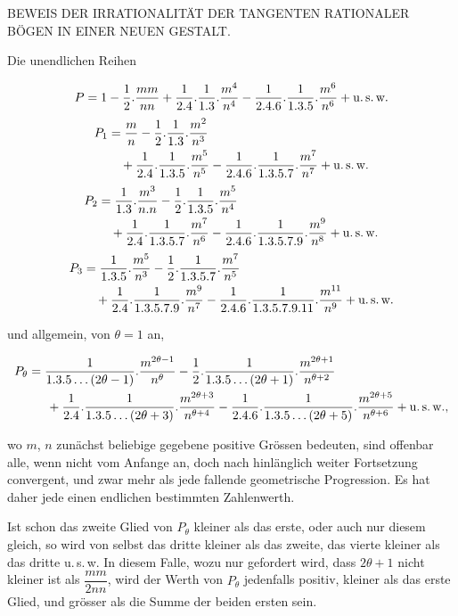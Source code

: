 \clearpage
{}

\begin{center}\large BEWEIS DER IRRATIONALITÄT DER TANGENTEN RATIONALER BÖGEN IN EINER NEUEN GESTALT.\end{center}

\noindent\hspace*{\parindent}Die unendlichen Reihen

\[
P = 1-\frac{1}{2} . \frac{mm}{nn}+\frac{1}{2.4} . \frac{1}{1.3} . \frac{m^4}{n^4}-\frac{1}{2.4.6} . \frac{1}{1.3.5} . \frac{m^6}{n^6}+\text{u.\,s.\,w.}
\]
\[
\begin{aligned}
P_1 &= \frac{m}{n}-\frac{1}{2} . \frac{1}{1.3} . \frac{m^2}{n^3}\\ &\quad+\frac{1}{2.4} . \frac{1}{1.3.5} . \frac{m^5}{n^5}-\frac{1}{2.4.6} . \frac{1}{1.3.5.7} . \frac{m^7}{n^7}+\text{u.\,s.\,w.}
\end{aligned}
\]
\[
\begin{aligned}
P_2 &= \frac{1}{1.3} . \frac{m^3}{n.n}-\frac{1}{2} . \frac{1}{1.3.5} . \frac{m^5}{n^4}\\ &\quad+\frac{1}{2.4} . \frac{1}{1.3.5.7} . \frac{m^7}{n^6}-\frac{1}{2.4.6} . \frac{1}{1.3.5.7.9} . \frac{m^9}{n^8}+\text{u.\,s.\,w.}
\end{aligned}
\]
\[
\begin{aligned}
P_3 &= \frac{1}{1.3.5} . \frac{m^5}{n^3}-\frac{1}{2} . \frac{1}{1.3.5.7} . \frac{m^7}{n^5}\\ &\quad+\frac{1}{2.4} . \frac{1}{1.3.5.7.9} . \frac{m^9}{n^7}-\frac{1}{2.4.6} . \frac{1}{1.3.5.7.9.11} . \frac{m^{11}}{n^9}+\text{u.\,s.\,w.}
\end{aligned}
\]

\noindent und allgemein, von $\theta = 1$ an,

\[
\begin{aligned}
P_\theta = {}& \frac{1}{1.3.5\ldots(2\theta-1)} . \frac{m^{2\theta-1}}{n^\theta}
-\frac{1}{2} . \frac{1}{1.3.5\ldots(2\theta+1)} . \frac{m^{2\theta+1}}{n^{\theta+2}}
\\ &\,+\frac{1}{2.4} . \frac{1}{1.3.5\ldots(2\theta+3)} . \frac{m^{2\theta+3}}{n^{\theta+4}}
-\frac{1}{2.4.6} . \frac{1}{1.3.5\ldots(2\theta+5)} . \frac{m^{2\theta+5}}{n^{\theta+6}}+\text{u.\,s.\,w.},
\end{aligned}
\]

\noindent wo $m$, $n$ zunächst beliebige gegebene positive Grössen bedeuten, sind
offenbar alle, wenn nicht vom Anfange an, doch nach hinlänglich weiter
Fortsetzung convergent, und zwar mehr als jede fallende geometrische
Progression. Es hat daher jede einen endlichen bestimmten Zahlenwerth.

Ist schon das zweite Glied von $P_\theta$ kleiner als das erste, oder auch
nur diesem gleich, so wird von selbst das dritte kleiner als das zweite, das
vierte kleiner als das dritte u.\,s.\,w. In diesem Falle, wozu nur gefordert
wird, dass $2\theta+1$ nicht kleiner ist als $\dfrac{mm}{2nn}$, wird der
Werth von $P_\theta$ jedenfalls positiv, kleiner als das erste Glied, und
grösser als die Summe der beiden ersten sein.
